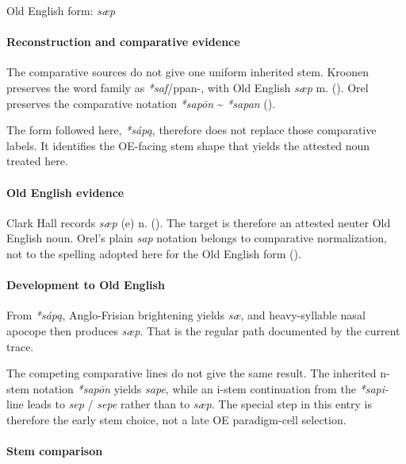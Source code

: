 \documentclass[
  british,
  a4paper,
]{article}
\begin{document}
Old English form: \emph{sæp}

\paragraph{Reconstruction and comparative
evidence}\label{reconstruction-and-comparative-evidence-23}

The comparative sources do not give one uniform inherited stem. Kroonen
preserves the word family as \emph{*saf}/ppan-, with Old English
\emph{sæp} m. (). Orel
preserves the comparative notation \emph{*sapōn} \textasciitilde{}
\emph{*sapan} ().

The form followed here, \emph{*sápą}, therefore does not replace those
comparative labels. It identifies the OE-facing stem shape that yields
the attested noun treated here.

\paragraph{Old English evidence}\label{old-english-evidence-23}

Clark Hall records \emph{sæp} (e) n. (). The target is therefore an attested neuter Old English
noun. Orel's plain \emph{sap} notation belongs to comparative
normalization, not to the spelling adopted here for the Old English form
().

\paragraph{Development to Old
English}\label{development-to-old-english-23}

From \emph{*sápą}, Anglo-Frisian brightening yields \emph{sæ}, and
heavy-syllable nasal apocope then produces \emph{sæp}. That is the
regular path documented by the current trace.

The competing comparative lines do not give the same result. The
inherited n-stem notation \emph{*sapōn} yields \emph{sape}, while an
i-stem continuation from the \emph{*sapi-} line leads to \emph{sep} /
\emph{sepe} rather than to \emph{sæp}. The special step in this entry is
therefore the early stem choice, not a late OE paradigm-cell selection.

\paragraph{Stem comparison}\label{stem-comparison-5}
\end{document}
